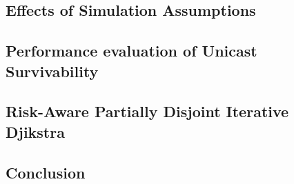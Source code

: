 \begin{doublespace}
\begin{singlespace}
\newcommand{\chapterFourName}{Effects of Simulation Assumptions}
\chapter[\chapterFourName]{\MakeUppercase\chapterFourName}\label{chapter:c4}
\end{singlespace}


\begin{singlespace}
\newcommand{\chapterFiveName}{Performance evaluation of Unicast Survivability }
\chapter[\chapterFiveName]{\MakeUppercase\chapterFiveName}\label{chapter:c5}
\end{singlespace}


\begin{singlespace}
\newcommand{\chapterSixName}{Risk-Aware Partially Disjoint Iterative Djikstra}
\chapter[\chapterSixName]{\MakeUppercase\chapterSixName}\label{chapter:c6}
\end{singlespace}


\begin{singlespace}
\newcommand{\chapterSevenName}{conclusion}
\chapter[\chapterSevenName]{\MakeUppercase\chapterSevenName}\label{chapter:c6}
\end{singlespace}


\begin{onehalfspace}
\backmatter


\end{onehalfspace}

\end{doublespace}

